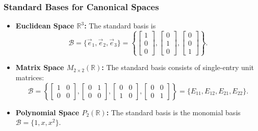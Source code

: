 \subsubsection*{Standard Bases for Canonical Spaces}
\begin{itemize}[itemsep=0.8em, topsep=0.5em]
    \item \textbf{Euclidean Space $\mathbb{R}^3$:} The standard basis is 
    \[
    \mathcal{B} = \{ \vec{e}_1, \vec{e}_2, \vec{e}_3 \} = \left\{ \begin{bmatrix} 1 \\ 0 \\ 0 \end{bmatrix}, \begin{bmatrix} 0 \\ 1 \\ 0 \end{bmatrix}, \begin{bmatrix} 0 \\ 0 \\ 1 \end{bmatrix} \right\}.
    \]
    \item \textbf{Matrix Space $M_{2\times 2}(\mathbb{R})$:} The standard basis consists of single-entry unit matrices:
    \[
    \mathcal{B} = \left\{ 
    \begin{bmatrix} 1 & 0 \\ 0 & 0 \end{bmatrix}, 
    \begin{bmatrix} 0 & 1 \\ 0 & 0 \end{bmatrix}, 
    \begin{bmatrix} 0 & 0 \\ 1 & 0 \end{bmatrix}, 
    \begin{bmatrix} 0 & 0 \\ 0 & 1 \end{bmatrix} 
    \right\} = \{E_{11}, E_{12}, E_{21}, E_{22}\}.
    \]
    \item \textbf{Polynomial Space $P_2(\mathbb{R})$:} The standard basis is the monomial basis $\mathcal{B} = \{1, x, x^2\}$.
\end{itemize}
\medskip
